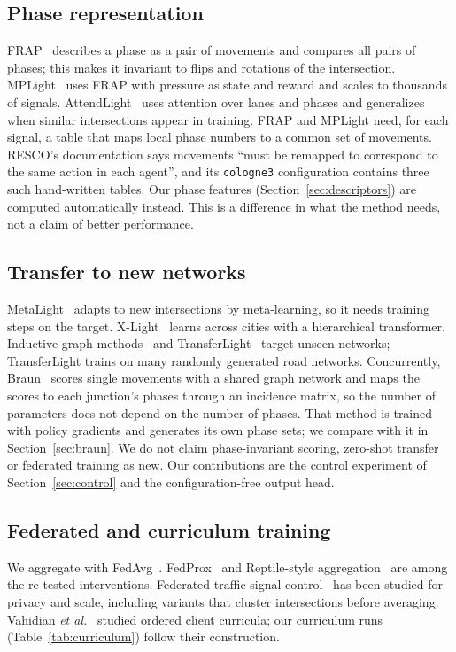 \documentclass[conference]{IEEEtran}
\begin{document}
\subsection{Phase representation}
FRAP~\cite{frap} describes a phase as a pair of movements and compares all pairs of
phases; this makes it invariant to flips and rotations of the intersection.
MPLight~\cite{mplight} uses FRAP with pressure as state and reward and scales to thousands
of signals. AttendLight~\cite{attendlight} uses attention over lanes and phases and
generalizes when similar intersections appear in training. FRAP and MPLight need, for each
signal, a table that maps local phase numbers to a common set of movements. RESCO's
documentation says movements ``must be remapped to correspond to the same action in each
agent'', and its \texttt{cologne3} configuration contains three such hand-written tables.
Our phase features (Section~\ref{sec:descriptors}) are computed automatically instead.
This is a difference in what the method needs, not a claim of better performance.

\subsection{Transfer to new networks}
MetaLight~\cite{metalight} adapts to new intersections by meta-learning, so it needs
training steps on the target. X-Light~\cite{xlight} learns across cities with a
hierarchical transformer. Inductive graph methods~\cite{igrl} and
TransferLight~\cite{transferlight} target unseen networks; TransferLight trains on many
randomly generated road networks. Concurrently, Braun~\cite{graphiface} scores single
movements with a shared graph network and maps the scores to each junction's phases
through an incidence matrix, so the number of parameters does not depend on the number of
phases. That method is trained with policy gradients and generates its own phase sets; we
compare with it in Section~\ref{sec:braun}. We do not claim phase-invariant scoring,
zero-shot transfer or federated training as new. Our contributions are the control
experiment of Section~\ref{sec:control} and the configuration-free output head.

\subsection{Federated and curriculum training}
We aggregate with FedAvg~\cite{fedavg}. FedProx~\cite{fedprox} and Reptile-style
aggregation~\cite{reptile} are among the re-tested interventions. Federated traffic signal
control~\cite{hfrl} has been studied for privacy and scale, including variants that
cluster intersections before averaging. Vahidian \emph{et al.}~\cite{curricula} studied
ordered client curricula; our curriculum runs (Table~\ref{tab:curriculum}) follow their
construction.
\end{document}
